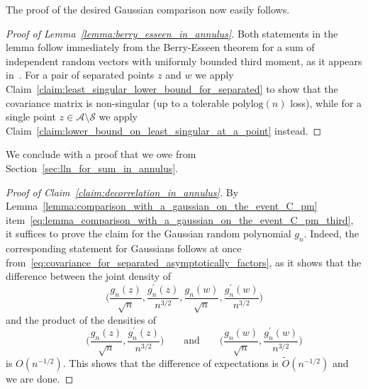 \documentclass[11pt]{amsart}
\theoremstyle{remark}
\theoremstyle{definition}
\newcommand{\cA}{\mathcal A}
\newcommand{\polylog}{\mathrm{polylog}}
\begin{document}
    The proof of the desired Gaussian comparison now easily follows. 
    \begin{proof}[Proof of Lemma~\ref{lemma:berry_esseen_in_annulus}]
        Both statements in the lemma follow immediately from the Berry-Esseen theorem for a sum of independent random vectors with uniformly bounded third moment, as it appears in~\cite[Corollary~17.2]{Bhattacharya-Rao}. For a pair of separated points $z$ and $w$ we apply Claim~\ref{claim:least_singular_lower_bound_for_separated} to show that the covariance matrix is non-singular (up to a tolerable $\polylog(n)$ loss), while for a single point $z\in \cA\setminus \mathcal{S}$ we apply Claim~\ref{claim:lower_bound_on_least_singular_at_a_point} instead. 
    \end{proof}
    We conclude with a proof that we owe from Section~\ref{sec:lln_for_sum_in_annulus}. 
    \begin{proof}[Proof of Claim~\ref{claim:decorrelation_in_annulus}]
        By Lemma~\ref{lemma:comparison_with_a_gaussian_on_the_event_C_pm} item~\eqref{eq:lemma_comparison_with_a_gaussian_on_the_event_C_pm_third}, it suffices to prove the claim for the Gaussian random polynomial $g_n$. Indeed, the corresponding statement for Gaussians follows at once from~\eqref{eq:covariance_for_separated_asymptotically_factors}, as it shows that the difference between the joint density of
        \[
        \Big( \frac{g_n(z)}{\sqrt{n}} , \frac{g_n^\prime(z)}{n^{3/2}} ,  \frac{g_n(w)}{\sqrt{n}} , \frac{g_n^\prime(w)}{n^{3/2}} \Big)
        \]
        and the product of the densities of
        \[
        \qquad \Big( \frac{g_n(z)}{\sqrt{n}} , \frac{g_n^\prime(z)}{n^{3/2}} \Big) \qquad \text{and}\qquad  \Big( \frac{g_n(w)}{\sqrt{n}} , \frac{g_n^\prime(w)}{n^{3/2}} \Big)
        \]
        is $O(n^{-1/2})$. This shows that the difference of expectations is $\widetilde{O}(n^{-1/2})$ and we are done. 
    \end{proof}
    
	\printbibliography[heading=bibliography]
	
	\medskip
    \medskip
    
\end{document}
